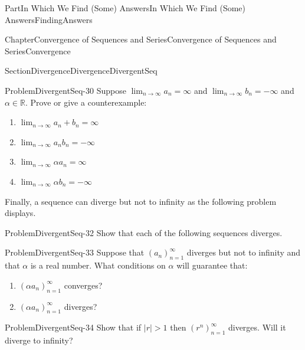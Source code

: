 \documentclass[oneside,10pt,]{book}
\numberwithin{equation}{part}
\newcommand{\abs}[1]{\left|#1\right|}
\def\limit#1#2#3{{\displaystyle\lim_{#1\rightarrow #2}#3}}
\newcommand{\RR}{\mathbb {R}}
\newcommand{\NN}{\mathbb {N}}
\newcommand{\amp}{&}
\begin{document}
\begin{partptx}{Part}{In Which We Find (Some) Answers}{}{In Which We Find (Some) Answers}{}{}{FindingAnswers}
\begin{chapterptx}{Chapter}{Convergence of Sequences and Series}{}{Convergence of Sequences and Series}{}{}{Convergence}
\begin{sectionptx}{Section}{Divergence}{}{Divergence}{}{}{DivergentSeq}
\begin{problem}{Problem}{}{DivergentSeq-30}%
Suppose \(\limit{n}{\infty}{a_n}=\infty\) and \(\limit{n}{\infty}{b_n}=-\infty\) and \(\alpha\in\RR\).  Prove or give a counterexample:%
\begin{enumerate}[font=\bfseries,label=(\alph*),ref=\alph*]%
\item{}\(\limit{n}{\infty}{a_n+b_n}=\infty\)%
\item{}\(\limit{n}{\infty}{a_nb_n}=-\infty\)%
\item{}\(\limit{n}{\infty}{\alpha a_n}=\infty\)%
\item{}\(\limit{n}{\infty}{\alpha b_n}=-\infty\)%
\end{enumerate}%
\end{problem}
Finally, a sequence can diverge but not to infinity as the following problem displays.%
\begin{problem}{Problem}{}{DivergentSeq-32}%
Show that each of the following sequences diverges.%
%
\end{problem}
\begin{problem}{Problem}{}{DivergentSeq-33}%
Suppose that \(\left(a_n\right)_{n=1}^\infty\) diverges but not to infinity and that \(\alpha\) is a real number. What conditions on \(\alpha\) will guarantee that:%
\begin{enumerate}[font=\bfseries,label=(\alph*),ref=\alph*]%
\item{}\(\left(\alpha a_n\right)_{n=1}^\infty\) converges?%
\item{}\(\left(\alpha a_n\right)_{n=1}^\infty\) diverges?%
\end{enumerate}%
\end{problem}
\begin{problem}{Problem}{}{DivergentSeq-34}%
Show that if \(\abs{r}>1\) then \(\left(r^n\right)_{n=1}^\infty\) diverges.  Will it diverge to infinity?%
\end{problem}
\end{sectionptx}

\end{chapterptx}
\end{partptx}
\end{document}
